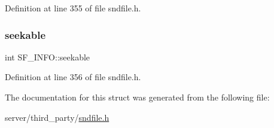Definition at line 355 of file sndfile.\+h.

\mbox{\label{struct_s_f___i_n_f_o_ad8978123d4122e137e9500f65d28ac31}} 
\subsubsection{\texorpdfstring{seekable}{seekable}}
{\footnotesize\ttfamily int S\+F\+\_\+\+I\+N\+F\+O\+::seekable}



Definition at line 356 of file sndfile.\+h.



The documentation for this struct was generated from the following file\+:\begin{DoxyCompactItemize}
\item 
server/third\+\_\+party/\mbox{\hyperlink{sndfile_8h}{sndfile.\+h}}\end{DoxyCompactItemize}
